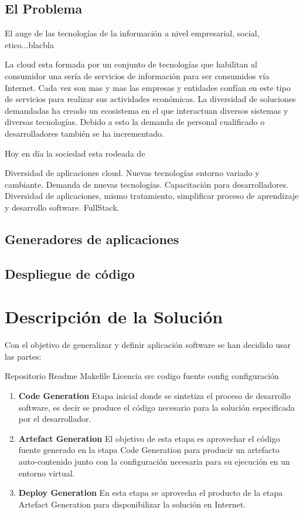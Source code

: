 \documentclass[a4paper,11pt]{book}
\begin{document}
\section{El Problema}

El auge de las tecnologías de la información a nivel empresarial, social, etico...blacbla


La cloud esta formada por un conjunto de tecnologías que habilitan al consumidor una sería de servicios de información para ser consumidos vía Internet. Cada vez son mas y mas las empresas y entidades confían en este tipo de servicios para realizar sus actividades económicas. La diversidad de soluciones demandadas ha creado un ecosistema en el que interactuan diversos sistemas y diversas tecnologías. Debido a esto la demanda de personal cualificado o desarrolladores también se ha incrementado. 

Hoy en día la sociedad esta rodeada de 


Diversidad de aplicaciones cloud. Nuevas tecnologías entorno variado y cambiante. Demanda de nuevas tecnologías.
Capacitación para desarrolladores. Diversidad de aplicaciones, mismo tratamiento, simplificar proceso de aprendizaje y desarrollo software. FullStack. 


\section{Generadores de aplicaciones}
\section{Despliegue de código}
 

\chapter{Descripción de la Solución}


Con el objetivo de generalizar y definir aplicación software se han decidido usar las partes:

Repositorio
Readme
Makefile
Licencia
src codigo fuente
config configuración


\begin{enumerate}
\item \textbf{ Code Generation }  Etapa inicial donde se sintetiza el proceso de desarrollo software, es decir se produce el código necesario para la solución especificada por el desarrollador. 
\item \textbf{ Artefact Generation }  El objetivo de esta etapa es aprovechar el código fuente generado en la etapa Code Generation para producir un artefacto auto-contenido junto con la configuración necesaria para su ejecución en un entorno virtual. 
\item \textbf{ Deploy Generation } En esta etapa se aprovecha el producto de la etapa Artefact Generation para disponibilizar la solución en Internet. 
\end{enumerate}
\end{document}

